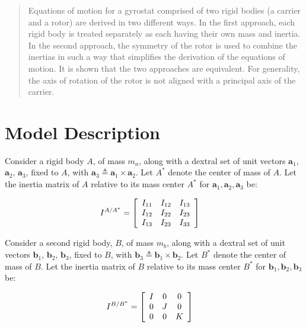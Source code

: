 \documentclass[letterpaper,11pt]{article}
\newcommand{\bs}[1]{ \boldsymbol{ #1 } }
\begin{document}
\begin{abstract}
  Equations of motion for a gyrostat comprised of two rigid bodies (a carrier and
  a rotor) are derived in two different ways.  In the first approach, each
  rigid body is treated separately as each having their own mass and
  inertia.  In the second approach, the symmetry of the rotor is used to
  combine the inertias in such a way that simplifies the derivation of the
  equations of motion.  It is shown that the two approaches are equivalent.
  For generality, the axis of rotation of the rotor is not aligned with a
  principal axis of the carrier.
\end{abstract}

\section*{Model Description}

Consider a rigid body $A$, of mass $m_a$, along with a dextral set of unit
vectors $\bs{a}_1$, $\bs{a}_2$, $\bs{a}_3$, fixed to $A$, with $\bs{a}_3
\triangleq \bs{a}_1 \times \bs{a}_2$.  Let $A^*$ denote the center of mass of
$A$.  Let the inertia matrix of $A$ relative to its mass center $A^*$ for
$\bs{a}_1, \bs{a}_2, \bs{a}_3$ be:

\begin{align*}
  I^{A/A^*} & =
    \left[ \begin{array}{c c c}
      I_{11} & I_{12} & I_{13} \\
      I_{12} & I_{22} & I_{23} \\
      I_{13} & I_{23} & I_{33}
    \end{array} \right]
\end{align*}

Consider a second rigid body, $B$, of mass $m_b$, along with a dextral set of unit
vectors $\bs{b}_1$, $\bs{b}_2$, $\bs{b}_3$, fixed to $B$, with $\bs{b}_3
\triangleq \bs{b}_1 \times \bs{b}_2$.  Let $B^*$ denote the center of mass of
$B$.  Let the inertia matrix of $B$ relative to its mass center  $B^*$ for
$\bs{b}_1, \bs{b}_2, \bs{b}_3$ be:

\begin{align*}
  I^{B/B^*} & =
    \left[ \begin{array}{c c c}
      I & 0 & 0 \\
      0 & J & 0 \\
      0 & 0 & K
    \end{array} \right]
\end{align*}
\end{document}
